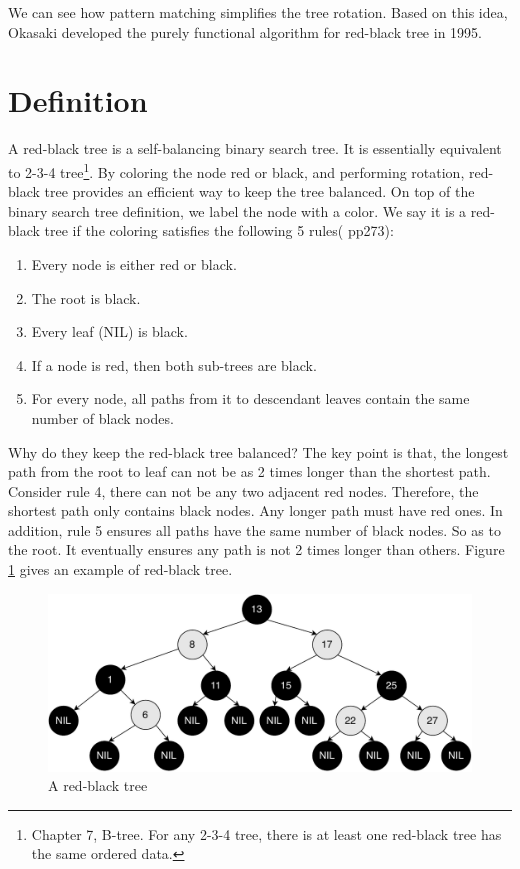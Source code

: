\documentclass[b5paper]{article}
\begin{document}
We can see how pattern matching simplifies the tree rotation. Based on this idea, Okasaki developed the purely functional algorithm for red-black tree in 1995\cite{okasaki}.

\begin{Exercise}
\end{Exercise}

\section{Definition}

A red-black tree is a self-balancing binary search tree\cite{wiki-rbt}. It is essentially equivalent to 2-3-4 tree\footnote{Chapter 7, B-tree. For any 2-3-4 tree, there is at least one red-black tree has the same ordered data.}. By coloring the node red or black, and performing rotation, red-black tree provides an efficient way to keep the tree balanced. On top of the binary search tree definition, we label the node with a color. We say it is a red-black tree if the coloring satisfies the following 5 rules(\cite{CLRS} pp273):

\begin{enumerate}
\item Every node is either red or black.
\item The root is black.
\item Every leaf (NIL) is black.
\item If a node is red, then both sub-trees are black.
\item For every node, all paths from it to descendant leaves contain the same number of black nodes.
\end{enumerate}

Why do they keep the red-black tree balanced? The key point is that, the longest path from the root to leaf can not be as 2 times longer than the shortest path. Consider rule 4, there can not be any two adjacent red nodes. Therefore, the shortest path only contains black nodes. Any longer path must have red ones. In addition, rule 5 ensures all paths have the same number of black nodes. So as to the root. It eventually ensures any path is not 2 times longer than others\cite{wiki-rbt}. Figure \ref{fig:rbt-example-with-nil} gives an example of red-black tree.

\begin{figure}[htbp]
  \centering
  \includegraphics[scale=0.35]{img/rbt-example-with-nil}
  \caption{A red-black tree}
  \label{fig:rbt-example-with-nil}
\end{figure}
\end{document}
